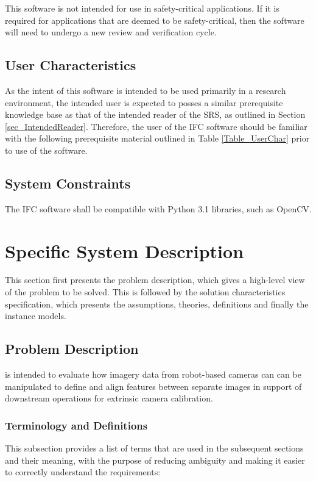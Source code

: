 \documentclass[12pt]{article}
\begin{document}
This software is not intended for use in safety-critical applications. If it is required for 
applications that are deemed to be safety-critical, then the software will need to undergo a new 
review and verification cycle.

\subsection{User Characteristics} \label{SecUserCharacteristics}
As the intent of this software is intended to be used primarily in a research environment, 
the intended user is expected to posses a similar prerequisite knowledge base as that of the 
intended reader of the SRS, as outlined in Section \ref{sec_IntendedReader}. Therefore, the 
user of the IFC software should be familiar with the following prerequisite material outlined 
in Table \ref{Table_UserChar} prior to use of the software. 

\subsection{System Constraints}
The IFC software shall be compatible with Python 3.1 libraries, such as
OpenCV.

\section{Specific System Description}
This section first presents the problem description, which gives a high-level
view of the problem to be solved.  This is followed by the solution characteristics
specification, which presents the assumptions, theories, definitions and finally
the instance models. 

\subsection{Problem Description} \label{Sec_pd}

\progname{} is intended to evaluate how imagery data from robot-based cameras can 
can be manipulated to define and align features between separate images in support 
of downstream operations for extrinsic camera calibration.

\subsubsection{Terminology and  Definitions}

This subsection provides a list of terms that are used in the subsequent
sections and their meaning, with the purpose of reducing ambiguity and making it
easier to correctly understand the requirements:
\end{document}
